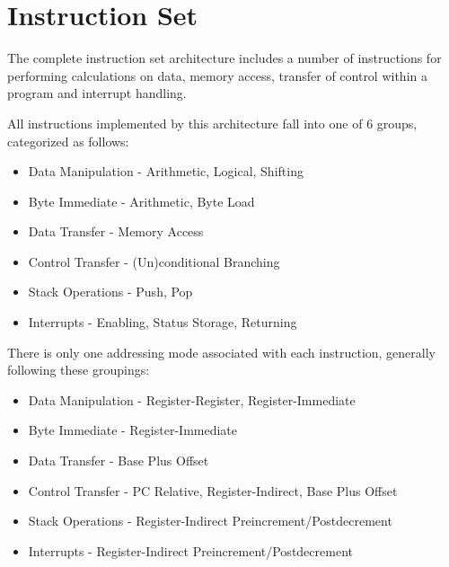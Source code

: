 
\newpage
\section{Instruction Set}

The complete instruction set architecture includes a number of instructions for performing calculations on data, memory access, transfer of control within a program and interrupt handling.


All instructions implemented by this architecture fall into one of 6 groups, categorized as follows:
\begin{itemize}
	\item Data Manipulation - Arithmetic, Logical, Shifting
	\item Byte Immediate - Arithmetic, Byte Load
	\item Data Transfer - Memory Access
	\item Control Transfer - (Un)conditional Branching
	\item Stack Operations - Push, Pop
	\item Interrupts - Enabling, Status Storage, Returning
\end{itemize}


 There is only one addressing mode associated with each instruction, generally following these groupings:
\begin{itemize}
	\item Data Manipulation - Register-Register, Register-Immediate
	\item Byte Immediate - Register-Immediate
	\item Data Transfer - Base Plus Offset
	\item Control Transfer - PC Relative, Register-Indirect, Base Plus Offset
	\item Stack Operations - Register-Indirect Preincrement/Postdecrement
	\item Interrupts - Register-Indirect Preincrement/Postdecrement
\end{itemize}


\newpage

